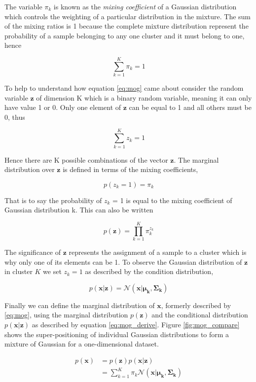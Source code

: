 The variable $\pi_k$ is known as the \emph{mixing coefficient} of a Gaussian distribution which controls the weighting of a particular distribution in the mixture. The sum of the mixing ratios is 1 because the complete mixture distribution represent the probability of a sample belonging to any one cluster and it must belong to one, hence

\[\sum_{k=1}^K\pi_k = 1\]

To help to understand how equation \ref{eq:mog} came about consider the random variable $\boldsymbol{z}$ of dimension K which is a binary random variable, meaning it can only have value 1 or 0. Only one element of $\boldsymbol{z}$ can be equal to 1 and all others must be 0, thus

\[\sum_{k=1}^Kz_k = 1\]

Hence there are K possible combinations of the vector $\boldsymbol{z}$. The marginal distribution over $\boldsymbol{z}$ is defined in terms of the mixing coefficients, 

\[p(z_k = 1) = \pi_k\]

That is to say the probability of $z_k$ = 1 is equal to the mixing coefficient of Gaussian distribution k. This can also be written

\[p(\boldsymbol{z}) = \prod^K_{k=1}\pi^{z_k}_k\]

The significance of $\boldsymbol{z}$ represents the assignment of a sample to a cluster which is why only one of its elements can be 1. To observe the Gaussian distribution of $\boldsymbol{z}$ in cluster $K$ we set $z_k = 1$ as described by the condition distribution,

\[p(\bm{x}|\boldsymbol{z}) = \mathcal{N}(\boldsymbol{x}|\boldsymbol{\mu_k}, \boldsymbol{\Sigma_k}) \]

Finally we can define the marginal distribution of $\boldsymbol{x}$, formerly described by \ref{eq:mog}, using the marginal distribution $p(\boldsymbol{z})$ and the conditional distribution $p(\bm{x}|\bm{z})$ as described by equation \ref{eq:mog_derive}. Figure \ref{fig:mog_compare} shows the super-positioning of individual Gaussian distributions to form a mixture of Gaussian for a one-dimensional dataset.

\begin{align}
	p(\bm{x}) 	&= p(\bm{z})p(\bm{x}|\bm{z})\\
				&= \sum^{K}_{k = 1}\pi_k \mathcal{N}(\boldsymbol{x}|\boldsymbol{\mu_k}, \boldsymbol{\Sigma_k})
\label{eq:mog_derive}
\end{align}


